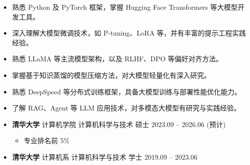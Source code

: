 \documentclass[zh]{resume}
\begin{document}
\makeheader

\begin{abstract}
清华大学计算机科学与技术专业硕士在读，预计 2026 年 6 月毕业。主攻大模型方向，在模型压缩与微调方面有深入研究和丰富实践。具备头部科技公司大模型算法实习经验，熟悉 LLaMA 架构、提示工程及性能优化。科研方面，以一作身份在 NeurIPS 发表论文，专注模型压缩与知识蒸馏。技术实践能力强，曾获 Kaggle 大模型微调比赛金牌，熟悉 PyTorch、DeepSpeed 及 Hugging Face Transformers 等开发框架与工具。
\end{abstract}

\begin{itemize}
    \item 熟悉 Python 及 PyTorch 框架，掌握 Hugging Face Transformers 等大模型开发工具。
    \item 深入理解大模型微调技术，如 P-tuning、LoRA 等，并有丰富的提示工程实践经验。
    \item 熟悉 LLaMA 等主流模型架构，以及 RLHF、DPO 等偏好对齐方法。
    \item 掌握基于知识蒸馏的模型压缩方法，对大模型轻量化有深入研究。
    \item 熟悉 DeepSpeed 等分布式训练框架，具备大模型训练与部署性能优化能力。
    \item 了解 RAG、Agent 等 LLM 应用技术，对多模态大模型有研究与实践经验。
\end{itemize}

\begin{itemize}
    \item \textbf{清华大学} \quad 计算机学院 \quad 计算机科学与技术 \quad 硕士 \hfill 2023.09 -- 2026.06 (预计)
    \begin{itemize}
        \item 专业排名前 5\%
    \end{itemize}
    \item \textbf{清华大学} \quad 计算机系 \quad 计算机科学与技术 \quad 学士 \hfill 2019.09 -- 2023.06
\end{itemize}
\end{document}
